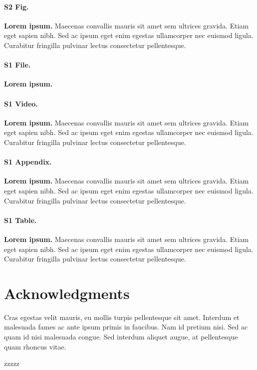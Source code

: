 \documentclass[
  10pt,
  letterpaper,
]{article}
\begin{document}
\paragraph*{S2 Fig.}
\label{s2-fig}
{\textbf{Lorem ipsum.}} Maecenas convallis mauris sit amet sem ultrices
gravida. Etiam eget sapien nibh. Sed ac ipsum eget enim egestas
ullamcorper nec euismod ligula. Curabitur fringilla pulvinar lectus
consectetur pellentesque.

\paragraph*{S1 File.}
\label{s1-file}
{\textbf{Lorem ipsum.}}

\paragraph*{S1 Video.}
\label{s1-video}
{\textbf{Lorem ipsum.}} Maecenas convallis mauris sit amet sem ultrices
gravida. Etiam eget sapien nibh. Sed ac ipsum eget enim egestas
ullamcorper nec euismod ligula. Curabitur fringilla pulvinar lectus
consectetur pellentesque.

\paragraph*{S1 Appendix.}
\label{s1-appendix}
{\textbf{Lorem ipsum.}} Maecenas convallis mauris sit amet sem ultrices
gravida. Etiam eget sapien nibh. Sed ac ipsum eget enim egestas
ullamcorper nec euismod ligula. Curabitur fringilla pulvinar lectus
consectetur pellentesque.

\paragraph*{S1 Table.}
\label{s1-table}
{\textbf{Lorem ipsum.}} Maecenas convallis mauris sit amet sem ultrices
gravida. Etiam eget sapien nibh. Sed ac ipsum eget enim egestas
ullamcorper nec euismod ligula. Curabitur fringilla pulvinar lectus
consectetur pellentesque.

\hypertarget{acknowledgments}{%
\section{Acknowledgments}\label{acknowledgments}}

Cras egestas velit mauris, eu mollis turpis pellentesque sit amet.
Interdum et malesuada fames ac ante ipsum primis in faucibus. Nam id
pretium nisi. Sed ac quam id nisi malesuada congue. Sed interdum aliquet
augue, at pellentesque quam rhoncus vitae.

zzzzz


\nolinenumbers
  
\end{document}
